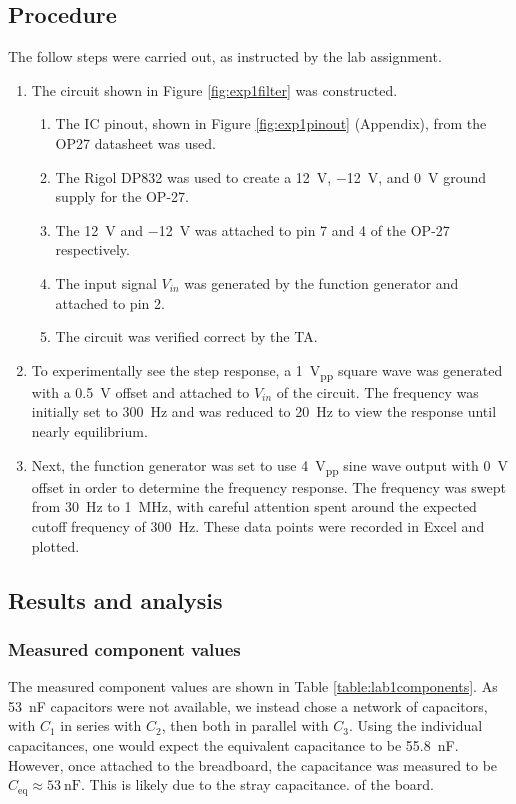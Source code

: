 \documentclass{report}
\newcommand{\pp}{_{pp}}
\newcommand{\Vpp}{\V\pp}
\begin{document}
	\subsection{Procedure}
	The follow steps were carried out, as instructed by the lab assignment.
	\begin{enumerate}
		\item The circuit shown in Figure \ref{fig:exp1filter} was constructed.
			\begin{enumerate}
				\item The IC pinout, shown in Figure \ref{fig:exp1pinout} (Appendix), from the OP27 datasheet was used.
				\item The Rigol DP832 was used to create a \SI{+12}{\V}, \SI{-12}{\V}, and \SI{0}{\V} ground supply for the OP-27.
				\item The \SI{+12}{\V} and \SI{-12}{\V} was attached to pin 7 and 4 of the OP-27 respectively.
				\item The input signal $V_{in}$ was generated by the function generator and attached to pin 2.
				\item The circuit was verified correct by the TA.
			\end{enumerate}
		
		\item To experimentally see the step response, a \SI{1}{\Vpp} square wave was generated with a \SI{0.5}{\V} offset and attached to $V_{in}$ of the circuit. The frequency was initially set to \SI{300}{\Hz} and was reduced to \SI{20}{\Hz} to view the response until nearly equilibrium.
		
		\item Next, the function generator was set to use \SI{4}{\Vpp} sine wave output with \SI{0}{\V} offset in order to determine the frequency response. The frequency was swept from \SI{30}{\Hz} to \SI{1}{\MHz}, with careful attention spent around the expected cutoff frequency of \SI{300}{\Hz}. These data points were recorded in Excel and plotted.
	\end{enumerate}
	
	\subsection{Results and analysis}
	
	\subsubsection{Measured component values}
	The measured component values are shown in Table \ref{table:lab1components}. 
	As \SI{53}{\nano\farad} capacitors were not available, we instead chose a network of capacitors, with $C_1$ in series with $C_2$, then both in parallel with $C_3$. Using the individual capacitances, one would expect the equivalent capacitance to be \SI{55.8}{\nano\farad}. However, once attached to the breadboard, the capacitance was measured to be $C_\mathrm{eq} \approx \SI{53}{\nano\farad}$. This is likely due to the stray capacitance. of the board.
	
\end{document}
